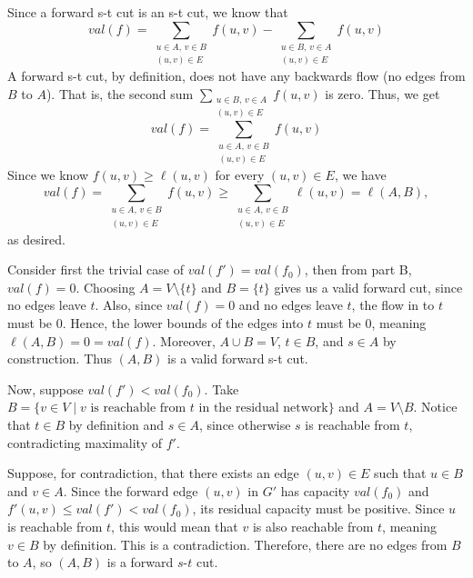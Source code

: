\documentclass[11pt]{exam}
\begin{document}
Since a forward s-t cut is an s-t cut, we know that
\[
  \mathit{val}(f) = \sum_{\substack{u \in A,\, v \in B \\ (u, v) \in
  E}} f(u, v) - \sum_{\substack{u \in B,\, v \in A \\ (u, v) \in E}} f(u, v)
\]
A forward s-t cut, by definition, does not have any backwards flow
(no edges from $B$ to $A$). That is, the second sum
$\sum_{\substack{u \in B,\, v \in A \\ (u, v) \in E}} f(u, v)$ is
zero. Thus, we get
\[
  \mathit{val}(f) = \sum_{\substack{u \in A,\, v \in B \\ (u, v) \in E}} f(u, v)
\]
Since we know $f(u,v) \geq \ell(u,v)$ for every $(u,v) \in E$, we have
\[
  \mathit{val}(f)
  = \sum_{\substack{u \in A,\, v \in B \\ (u,v) \in E}} f(u,v)
  \geq \sum_{\substack{u \in A,\, v \in B \\ (u,v) \in E}} \ell(u,v)
  = \ell(A,B),
\]
as desired.

Consider first the trivial case of $\mathit{val}(f') = \mathit{val}(f_0)$,
then from part B, $\mathit{val}(f) = 0$. Choosing $A = V \setminus
\{t\}$ and $B = \{t\}$ gives us a valid forward cut, since no edges leave $t$.
Also, since $\mathit{val}(f) = 0$ and no edges leave $t$, the flow in
to $t$ must be 0. Hence, the lower bounds of the edges into $t$ must
be 0, meaning $\ell(A, B) = 0 = \mathit{val}(f)$. Moreover, $A \cup B
= V$, $t \in B$, and $s \in A$ by construction. Thus $(A, B)$
is a valid forward s-t cut.

Now, suppose $\mathit{val}(f') < \mathit{val}(f_0)$. Take $B = \{v
  \in V \mid v \text{ is reachable from } t \text{ in the residual
network}\}$ and $A = V \setminus B$. Notice that $t \in B$ by
definition and $s \in A$, since otherwise $s$ is reachable from $t$,
contradicting maximality of $f'$.

Suppose, for contradiction, that there exists an edge $(u,v) \in E$
such that $u \in B$ and $v \in A$. Since the forward edge $(u,v)$ in
$G'$ has capacity $\mathit{val}(f_0)$ and $f'(u,v) \leq
\mathit{val}(f') < \mathit{val}(f_0)$, its residual capacity must be
positive. Since $u$ is reachable from $t$, this would mean that $v$
is also reachable from $t$, meaning $v \in B$ by definition. This is
a contradiction. Therefore, there are no edges from $B$ to $A$, so
$(A, B)$ is a forward $s$-$t$ cut.
\end{document}
